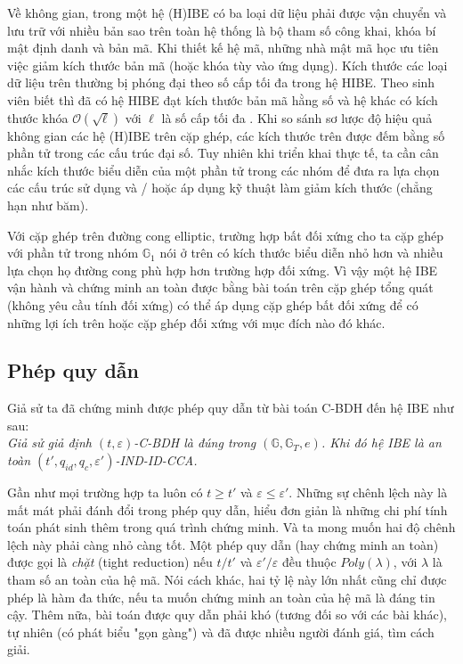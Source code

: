 \documentclass[class=report, crop=false]{standalone}
\begin{document}
			Về không gian, trong một hệ (H)IBE có ba loại dữ liệu phải được vận chuyển và lưu trữ với nhiều bản sao trên toàn hệ thống là bộ tham số công khai, khóa bí mật định danh và bản mã. Khi thiết kế hệ mã, những nhà mật mã học ưu tiên việc giảm kích thước bản mã (hoặc khóa tùy vào ứng dụng). Kích thước các loại dữ liệu trên thường bị phóng đại theo số cấp tối đa trong hệ HIBE. Theo sinh viên biết thì đã có hệ HIBE đạt kích thước bản mã hằng số và hệ khác có kích thước khóa $\mathcal{O}(\sqrt{\ell})$ với $\ell$ là số cấp tối đa \cite{DBLP:conf/eurocrypt/BonehBG05}. Khi so sánh sơ lược độ hiệu quả không gian các hệ (H)IBE trên cặp ghép, các kích thước trên được đếm bằng số phần tử trong các cấu trúc đại số. Tuy nhiên khi triển khai thực tế, ta cần cân nhắc kích thước biểu diễn của một phần tử trong các nhóm để đưa ra lựa chọn các cấu trúc sử dụng và / hoặc áp dụng kỹ thuật làm giảm kích thước (chẳng hạn như băm).

			Với cặp ghép trên đường cong elliptic, trường hợp bất đối xứng cho ta cặp ghép với phần tử trong nhóm $\mathbb{G}_1$ nói ở trên có kích thước biểu diễn nhỏ hơn và nhiều lựa chọn họ đường cong phù hợp hơn trường hợp đối xứng. Vì vậy một hệ IBE vận hành và chứng minh an toàn được bằng bài toán trên cặp ghép tổng quát (không yêu cầu tính đối xứng) có thể áp dụng cặp ghép bất đối xứng để có những lợi ích trên hoặc cặp ghép đối xứng với mục đích nào đó khác.
		\subsection{Phép quy dẫn}
			Giả sử ta đã chứng minh được phép quy dẫn từ bài toán C-BDH đến hệ IBE \scheme như sau: \\ \indent
			\textit{
			Giả sử giả định $(t, \varepsilon)$-C-BDH là đúng trong $(\mathbb{G}, \mathbb{G}_T, e)$. Khi đó hệ IBE \scheme là an toàn $(t', q_{id}, q_c, \varepsilon')$-IND-ID-CCA.}
			
			Gần như mọi trường hợp ta luôn có $t \geq t'$ và $\varepsilon \leq \varepsilon'$. Những sự chênh lệch này là mất mát phải đánh đổi trong phép quy dẫn, hiểu đơn giản là những chi phí tính toán phát sinh thêm trong quá trình chứng minh. Và ta mong muốn hai độ chênh lệch này phải càng nhỏ càng tốt. Một phép quy dẫn (hay chứng minh an toàn) được gọi là \textit{chặt} (tight reduction) nếu $t / t'$ và $\varepsilon' / \varepsilon$ đều thuộc $Poly(\lambda)$, với $\lambda$ là tham số an toàn của hệ mã. Nói cách khác, hai tỷ lệ này lớn nhất cũng chỉ được phép là hàm đa thức, nếu ta muốn chứng minh an toàn của hệ mã là đáng tin cậy. Thêm nữa, bài toán được quy dẫn phải khó (tương đối so với các bài khác), tự nhiên (có phát biểu "gọn gàng") và đã được nhiều người đánh giá, tìm cách giải.
\end{document}
